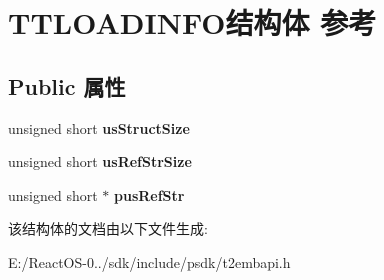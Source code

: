 \hypertarget{struct_t_t_l_o_a_d_i_n_f_o}{}\section{T\+T\+L\+O\+A\+D\+I\+N\+F\+O结构体 参考}
\label{struct_t_t_l_o_a_d_i_n_f_o}
\subsection*{Public 属性}
\begin{DoxyCompactItemize}
\item 
\mbox{\label{struct_t_t_l_o_a_d_i_n_f_o_a4a87aa4853ba14051e6dea2146a9d1ee}} 
unsigned short {\bfseries us\+Struct\+Size}
\item 
\mbox{\label{struct_t_t_l_o_a_d_i_n_f_o_a64f7b6c0315e5a80262ab2644f48557c}} 
unsigned short {\bfseries us\+Ref\+Str\+Size}
\item 
\mbox{\label{struct_t_t_l_o_a_d_i_n_f_o_a865c333a5fd47ba1bfae29f0d42f2211}} 
unsigned short $\ast$ {\bfseries pus\+Ref\+Str}
\end{DoxyCompactItemize}


该结构体的文档由以下文件生成\+:\begin{DoxyCompactItemize}
\item 
E\+:/\+React\+O\+S-\/0../sdk/include/psdk/t2embapi.\+h\end{DoxyCompactItemize}
